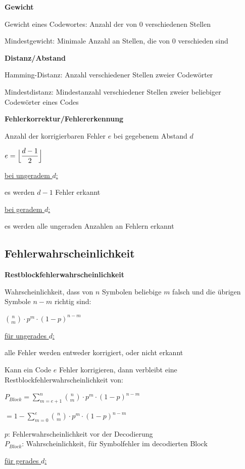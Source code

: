 \textbf{Gewicht}

Gewicht eines Codewortes: Anzahl der von 0 verschiedenen Stellen

Mindestgewicht: Minimale Anzahl an Stellen, die von 0 verschieden sind

\textbf{Distanz/Abstand}

Hamming-Distanz: Anzahl verschiedener Stellen zweier Codewörter

Mindestdistanz: Mindestanzahl verschiedener Stellen zweier beliebiger Codewörter eines Codes

\textbf{Fehlerkorrektur/Fehlererkennung}

Anzahl der korrigierbaren Fehler $e$ bei gegebenem Abstand $d$

$\displaystyle{
    e = \Bigl\lfloor \frac{d - 1}{2} \Bigr\rfloor
}$

\underline{bei ungeradem $d$:}

es werden $d-1$ Fehler erkannt

\underline{bei geradem $d$:}

es werden alle ungeraden Anzahlen an Fehlern erkannt

\subsection{Fehlerwahrscheinlichkeit}

\textbf{Restblockfehlerwahrscheinlichkeit}

Wahrscheinlichkeit, dass von $n$ Symbolen beliebige $m$ falsch und die übrigen Symbole $n-m$ richtig sind:

$\displaystyle{
    \binom{n}{m} \cdot p^m \cdot (1 - p)^{n-m}
}$

\underline{für ungerades $d$:}

alle Fehler werden entweder korrigiert, oder nicht erkannt

Kann ein Code $e$ Fehler korrigieren, dann verbleibt eine Restblockfehlerwahrscheinlichkeit von:

$\displaystyle{
    P_{Block} = \sum_{m = e + 1}^{n} \binom{n}{m} \cdot p^m \cdot (1 - p)^{n-m}
}$

$\displaystyle{
    = 1 - \sum_{m=0}^{e} \binom{n}{m} \cdot p^m \cdot (1 - p)^{n-m}
}$

$p$: Fehlerwahrscheinlichkeit vor der Decodierung\\
$P_{Block}$: Wahrscheinlichkeit, für Symbolfehler im decodierten Block

\underline{für gerades $d$:}

